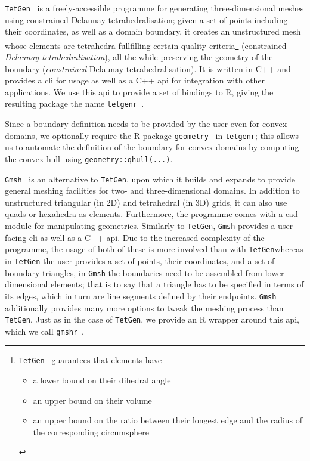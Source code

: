 \documentclass[british]{scrreprt}
\begin{document}
\texttt{TetGen}~\cite{SiTetGenDelaunayBasedQuality2015} is a freely-accessible programme for generating three-dimensional meshes using constrained Delaunay tetrahedralisation; given a set of points including their coordinates, as well as a domain boundary, it creates an unstructured mesh whose elements are tetrahedra fullfilling certain quality criteria\footnote{\texttt{TetGen}~\cite{SiTetGenDelaunayBasedQuality2015} guarantees that elements have \begin{itemize}
    \item a lower bound on their dihedral angle
    \item an upper bound on their volume
    \item an upper bound on the ratio between their longest edge and the radius of the corresponding circumsphere
\end{itemize}} (constrained \textit{Delaunay tetrahedralisation}), all the while preserving the geometry of the boundary (\textit{constrained} Delaunay tetrahedralisation). It is written in C++ and provides a \gls{cli} for usage as well as a C++ \gls{api} for integration with other applications. We use this \gls{api} to provide a set of bindings to R, giving the resulting package the name \texttt{tetgenr}~\cite{Sudwojinla3dt2022}.

Since a boundary definition needs to be provided by the user even for convex domains, we optionally require the R package \texttt{geometry}~\cite{SterratgeometryMeshGeneration2022} in \texttt{tetgenr}; this allows us to automate the definition of the boundary for convex domains by computing the convex hull using \texttt{geometry::qhull(...)}.

\texttt{Gmsh}~\cite{GeuzaineGmsh3Dfinite2009} is an alternative to \texttt{TetGen}, upon which it builds and expands to provide general meshing facilities for two- and three-dimensional domains. In addition to unstructured triangular (in 2D) and tetrahedral (in 3D) grids, it can also use quads or hexahedra as elements. Furthermore, the programme comes with a \gls{cad} module for manipulating geometries. Similarly to \texttt{TetGen}, \texttt{Gmsh} provides a user-facing \gls{cli} as well as a C++ \gls{api}. Due to the increased complexity of the programme, the usage of both of these is more involved than with \texttt{TetGen}\textemdash{}whereas in \texttt{TetGen} the user provides a set of points, their coordinates, and a set of boundary triangles, in \texttt{Gmsh} the boundaries need to be assembled from lower dimensional elements; that is to say that a triangle has to be specified in terms of its edges, which in turn are line segments defined by their endpoints. \texttt{Gmsh} additionally provides many more options to tweak the meshing process than \texttt{TetGen}. Just as in the case of \texttt{TetGen}, we provide an R wrapper around this \gls{api}, which we call \texttt{gmshr}~\cite{Sudwojinla3dt2022}.
\end{document}
